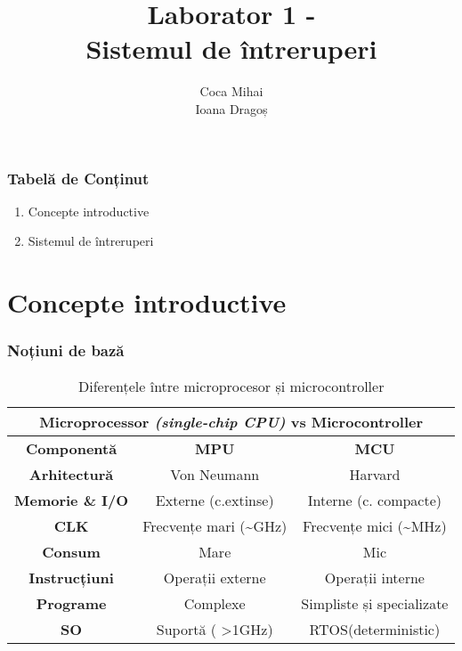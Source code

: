 \documentclass[xcolor={table}]{beamer}
\title{Laborator 1 - \\
Sistemul de întreruperi}
\subtitle{}
\author{Coca Mihai \\
        Ioana Dragoș}
\begin{document}
	\setcounter{showProgressBar}{0}
	\setcounter{showSlideNumbers}{0}

	\frame{\titlepage}

	\begin{frame}
		\frametitle{Tabelă de Conținut}
		\begin{enumerate}
			\item Concepte introductive
			\item Sistemul de întreruperi
		\end{enumerate}
	\end{frame}

	\setcounter{framenumber}{0}
	\setcounter{showProgressBar}{1}
	\setcounter{showSlideNumbers}{1}
	\section{Concepte introductive}
	\begin{frame}
		\frametitle{Noțiuni de bază}
        \begin{center}
        \begin{table}
        \begin{tabular}{ |c||c|c|  }
         \hline
         \multicolumn{3}{|c|}{\textbf{Microprocessor \textit{(single-chip CPU)} vs Microcontroller}} \\
         \hline
         \hline
         \textbf{Componentă}  &  \textbf{MPU} &  \textbf{MCU}\\
         \hline
         \textbf{Arhitectură}   & Von Neumann   & Harvard\\
         \hline
         \textbf{Memorie \& I/O} &   Externe (c.extinse)  & Interne (c. compacte)\\
         \hline
         \textbf{CLK} & Frecvențe mari (\sim GHz) & Frecvențe mici (\sim MHz)\\
         \hline
         \textbf{Consum}    & Mare & Mic\\
         \hline
         \textbf{Instrucțiuni} &   Operații externe & Operații interne\\
         \hline
         \textbf{Programe} & Complexe  & Simpliste și specializate\\
         \hline
         \textbf{SO} & Suportă ( >1GHz)  & RTOS(deterministic)\\
         \hline
        \end{tabular}
        \caption{\label{tab:1} Diferențele între microprocesor și microcontroller}
        \end{table}
        \end{center}
	\end{frame}
\end{document}
